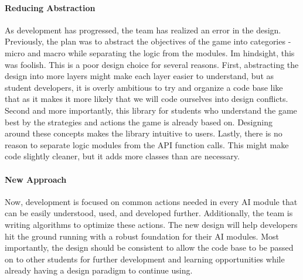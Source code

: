 \paragraph{Reducing Abstraction}
As development has progressed, the team has realized an error in the design. Previously, the plan was to abstract the objectives of the game into categories - micro and macro while separating the logic from the modules. Im hindsight, this was foolish. This is a poor design choice for several reasons. First, abstracting the design into more layers might make each layer easier to understand, but as student developers, it is overly ambitious to try and organize a code base like that as it makes it more likely that we will code ourselves into design conflicts. Second and more importantly, this library for students who understand the game best by the strategies and actions the game is already based on. Designing around these concepts makes the library intuitive to users. Lastly, there is no reason to separate logic modules from the API function calls. This might make code slightly cleaner, but it adds more classes than are necessary.
\paragraph{New Approach}
Now, development is focused on common actions needed in every AI module that can be easily understood, used, and developed further. Additionally, the team is writing algorithms to optimize these actions. The new design will help developers hit the ground running with a robust foundation for their AI modules. Most importantly, the design should be consistent to allow the code base to be passed on to other students for further development and learning opportunities while already having a design paradigm to continue using. 





